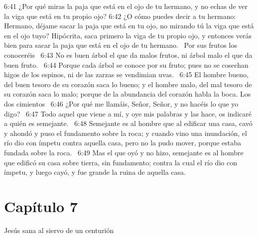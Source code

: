 6:41 ¿Por qué miras la paja que está en el ojo de tu hermano, y no echas de ver la viga que está en tu propio ojo? 
6:42 ¿O cómo puedes decir a tu hermano: Hermano, déjame sacar la paja que está en tu ojo, no mirando tú la viga que está en el ojo tuyo? Hipócrita, saca primero la viga de tu propio ojo, y entonces verás bien para sacar la paja que está en el ojo de tu hermano.  
Por sus frutos los conoceréis   
6:43 No es buen árbol el que da malos frutos, ni árbol malo el que da buen fruto.  
6:44 Porque cada árbol se conoce por su fruto; pues no se cosechan higos de los espinos, ni de las zarzas se vendimian uvas.  
6:45 El hombre bueno, del buen tesoro de su corazón saca lo bueno; y el hombre malo, del mal tesoro de su corazón saca lo malo; porque de la abundancia del corazón habla la boca. 
Los dos cimientos   
6:46 ¿Por qué me llamáis, Señor, Señor, y no hacéis lo que yo digo?  
6:47 Todo aquel que viene a mí, y oye mis palabras y las hace, os indicaré a quién es semejante.  
6:48 Semejante es al hombre que al edificar una casa, cavó y ahondó y puso el fundamento sobre la roca; y cuando vino una inundación, el río dio con ímpetu contra aquella casa, pero no la pudo mover, porque estaba fundada sobre la roca.  
6:49 Mas el que oyó y no hizo, semejante es al hombre que edificó su casa sobre tierra, sin fundamento; contra la cual el río dio con ímpetu, y luego cayó, y fue grande la ruina de aquella casa.  
\section*{Capítulo 7}
Jesús sana al siervo de un centurión   

